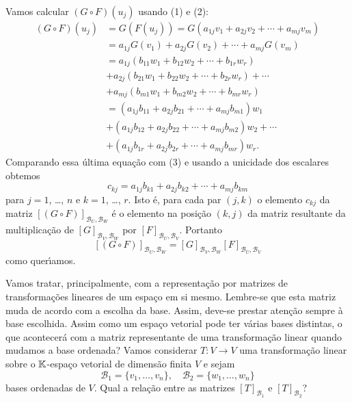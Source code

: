 \begin{prova}
  Vamos calcular $(G\circ F)(u_j)$ usando (1) e (2):
  \begin{align*}
    (G\circ F)(u_j) &= G(F(u_j)) = G(a_{1j}v_1 + a_{2j}v_2 + \cdots + a_{mj}v_m)\\
    &= a_{1j}G(v_1) + a_{2j}G(v_2) + \cdots + a_{mj}G(v_m)\\
    &= a_{1j}(b_{11}w_1 + b_{12}w_2 + \cdots + b_{1r}w_r) \\ &+ a_{2j}(b_{21}w_1 + b_{22}w_2 + \cdots + b_{2r}w_r) + \cdots \\ &+ a_{mj}(b_{m1}w_1 + b_{m2}w_2 + \cdots + b_{mr}w_r)\\
    &= (a_{1j}b_{11} + a_{2j}b_{21} + \cdots + a_{mj}b_{m1})w_1 \\ &+ (a_{1j}b_{12} + a_{2j}b_{22} + \cdots + a_{mj}b_{m2})w_2 + \cdots \\ &+ (a_{1j}b_{1r} + a_{2j}b_{2r} + \cdots + a_{mj}b_{mr})w_r.
  \end{align*}
  Comparando essa \'ultima equa\c{c}\~ao com (3) e usando a unicidade dos escalares obtemos
  \[
    c_{kj} = a_{1j}b_{k1} + a_{2j}b_{k2} + \cdots + a_{mj}b_{km}
  \]
  para $j=1$, \dots, $n$ e $k = 1$, \dots, $r$. Isto \'e, para cada par $(j,k)$ o elemento $c_{kj}$ da matriz $[(G\circ F)]_{{\mathcal{B}_U},{\mathcal{B}_W}}$ \'e o elemento na posi\c{c}\~ao $(k,j)$ da matriz resultante da multiplica\c{c}\~ao de $[G]_{{\mathcal{B}_V},{\mathcal{B}_W}}$ por $[F]_{{\mathcal{B}_U},{\mathcal{B}_V}}$. Portanto
  \[
    [(G\circ F)]_{{\mathcal{B}_U},{\mathcal{B}_W}} = [G]_{{\mathcal{B}_V},{\mathcal{B}_W}}[F]_{{\mathcal{B}_U},{\mathcal{B}_V}}
  \]
  como quer{\'\i}amos.
\end{prova}

Vamos tratar, principalmente, com a representa\c{c}\~ao por matrizes de transforma\c{c}\~oes lineares de um espa\c{c}o em si mesmo. Lembre-se que esta matriz muda de acordo com a escolha da base. Assim, deve-se prestar aten\c{c}\~ao sempre \`a base escolhida. Assim como um espa\c{c}o vetorial pode ter v\'arias bases distintas, o que acontecer\'a com a matriz representante de uma transforma\c{c}\~ao linear quando mudamos a base ordenada? Vamos considerar $T : V \to V$ uma transforma\c{c}\~ao linear sobre o $\mathbb{K}$-espa\c{c}o vetorial de dimens\~ao finita $V$ e sejam
\[
  \mathcal{B}_1 = \{v_1,\dots,v_n\}, \quad \mathcal{B}_2 = \{w_1,\dots,w_n\}
\]
bases ordenadas de $V$. Qual a rela\c{c}\~ao entre as matrizes $[T]_{\mathcal{B}_1}$ e $[T]_{\mathcal{B}_2}$?

